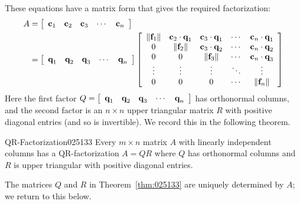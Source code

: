 These equations have a matrix form that gives the required factorization:
\begin{align} 
A & = \left[ \begin{array}{ccccc}
\textbf{c}_{1} & \textbf{c}_{2} & \textbf{c}_{3} & \cdots & \textbf{c}_{n}
\end{array} \right] \nonumber \\
&= \left[ \begin{array}{ccccc}
\textbf{q}_{1} & \textbf{q}_{2} & \textbf{q}_{3} & \cdots & \textbf{q}_{n}
\end{array} \right] \left[ \begin{array}{ccccc}
\| \textbf{f}_{1} \| & \textbf{c}_{2} \cdot \textbf{q}_{1} & \textbf{c}_{3} \cdot \textbf{q}_{1} & \cdots & \textbf{c}_{n} \cdot \textbf{q}_{1} \\
0 & \| \textbf{f}_{2} \| & \textbf{c}_{3} \cdot \textbf{q}_{2} & \cdots & \textbf{c}_{n} \cdot \textbf{q}_{2} \\
0 & 0 & \| \textbf{f}_{3} \| & \cdots & \textbf{c}_{n} \cdot \textbf{q}_{3} \\
\vdots & \vdots & \vdots & \ddots & \vdots \\
0 & 0 & 0 & \cdots & \| \textbf{f}_{n} \|
\end{array} \right] \label{matrixFactEq}
\end{align}
Here the first factor $Q = \left[ \begin{array}{ccccc}
\textbf{q}_{1} & \textbf{q}_{2} & \textbf{q}_{3} & \cdots & \textbf{q}_{n}
\end{array}\right]$ has orthonormal columns, and the second factor is an $n \times n$ upper triangular matrix $R$ with positive diagonal entries (and so is invertible). We record this in the following theorem.

\begin{theorem}{QR-Factorization}{025133}
Every $m \times n$ matrix $A$ with linearly independent columns has a QR-factorization $A = QR$ where $Q$ has orthonormal columns and $R$ is upper triangular with positive diagonal entries.
\end{theorem}

\noindent The matrices $Q$ and $R$ in Theorem~\ref{thm:025133} are uniquely determined by $A$; we return to this below.


